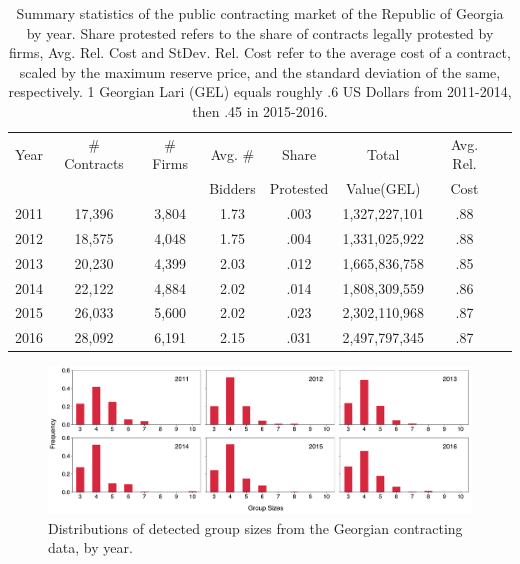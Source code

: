 \begin{table}[]
\begin{tabular}{@{}lccccccc{}}\toprule
Year & \# Contracts & \# Firms & Avg. \# & Share& Total & Avg. Rel. \\
 &  &  & Bidders &Protested & Value(GEL)  & Cost   \\
\midrule
2011 & 17,396   & 3,804 & 1.73 & .003& 1,327,227,101 & .88 & \\
2012 & 18,575  & 4,048 & 1.75 & .004&1,331,025,922& .88 & \\
2013 & 20,230   & 4,399 & 2.03& .012 & 1,665,836,758 & .85 & \\
2014 & 22,122  & 4,884 & 2.02& .014 &1,808,309,559 & .86 &\\
2015 & 26,033   & 5,600 & 2.02& .023 & 2,302,110,968 & .87 &\\
2016 & 28,092  & 6,191 & 2.15& .031 &2,497,797,345 & .87 & \\
\bottomrule
\end{tabular}
\caption[Georgian market summary statistics]{Summary statistics of the public contracting market of the Republic of Georgia by year. Share protested refers to the share of contracts legally protested by firms, Avg. Rel. Cost and StDev. Rel. Cost refer to the average cost of a contract, scaled by the maximum reserve price, and the standard deviation of the same, respectively. 1 Georgian Lari (GEL) equals roughly .6 US Dollars from 2011-2014, then  .45 in 2015-2016.}
\label{tab:app_georgia_summary}
\end{table}

\begin{figure}
\includegraphics[width=\textwidth]{images/cartels/ga_group_sizes.pdf}
\caption{Distributions of detected group sizes from the Georgian contracting data, by year.}
\label{fig:ga_group_sizes}
\end{figure}




